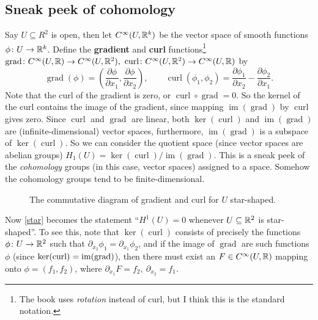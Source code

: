 \subsection{Sneak peek of cohomology}
Say $U \subseteq R^2$ is open, then let $C^{\infty}(U, \mathbb{R}^k)$ be the vector space of smooth functions $\phi \colon U \to \mathbb{R}^k$. Define the \textbf{gradient} and \textbf{curl} functions\footnote{The book uses \emph{rotation} instead of curl, but I think this is the standard notation.} $\operatorname{grad}\colon C^{\infty} (U,\mathbb{R})\to C^{\infty}(U, \mathbb{R}^2), \ \operatorname{curl}\colon C^{\infty}(U,\mathbb{R}^2) \to C^{\infty}(U,\mathbb{R})$ by \[
    \operatorname{grad}(\phi) = \left( \frac{\partial \phi}{\partial x_1}, \frac{\partial \phi}{\partial x_2} \right) , \qquad \operatorname{curl}(\phi_1,\phi_2)= \frac{\partial \phi_1}{\partial x_2}-\frac{\partial \phi_2}{\partial x_1}.
\] Note that the curl of the gradient is zero, or $\operatorname{curl}\circ \operatorname{grad}=0$. So the kernel of the curl contains the image of the gradient, since mapping $\operatorname{im}(\operatorname{grad})$ by $\operatorname{curl}$ gives zero. Since $\operatorname{curl}$ and $\operatorname{grad}$ are linear, both $\ker (\operatorname{curl})$ and $\operatorname{im}(\operatorname{grad})$ are (infinite-dimensional) vector spaces, furthermore, $\operatorname{im}(\operatorname{grad})$ is a subspace of $\ker (\operatorname{curl})$. So we can consider the quotient space (since vector spaces are abelian groups) $H_1(U)=\ker (\operatorname{curl}) / \operatorname{im}(\operatorname{grad})$. This is a sneak peek of the \emph{cohomology} groups (in this case, vector spaces) assigned to a space. Somehow the cohomology groups tend to be finite-dimensional.
\begin{figure}[H]
\centering
{}
\caption{The commutative diagram of gradient and curl for $U$ star-shaped.}
\end{figure}
Now \cref{star} becomes the statement ``$H^1(U)=0$ whenever $U \subseteq \mathbb{R}^2$ is star-shaped''. To see this, note that $\ker (\operatorname{curl})$ consists of precisely the functions $\phi \colon U \to \mathbb{R}^2$ such that $\partial _{x_2}\phi_1=\partial _{x_1}\phi_2$, and if the image of $\operatorname{grad}$ are such functions $\phi$ (since $\ker(\operatorname{curl})=\operatorname{im} (\operatorname{grad})$), then there must exist an $F \in C^{\infty}(U, \mathbb{R}) $ mapping onto $\phi=(f_1,f_2)$, where $\partial _{x_1}F=f_2, \ \partial _{x_2}=f_1$.

